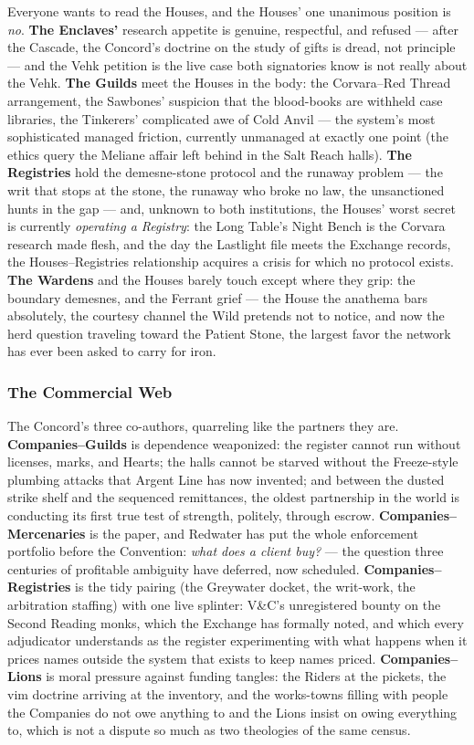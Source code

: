 Everyone wants to read the Houses, and the Houses' one unanimous position is \textit{no}. \textbf{The Enclaves'} research appetite is genuine, respectful, and refused --- after the Cascade, the Concord's doctrine on the study of gifts is dread, not principle --- and the Vehk petition is the live case both signatories know is not really about the Vehk. \textbf{The Guilds} meet the Houses in the body: the Corvara--Red Thread arrangement, the Sawbones' suspicion that the blood-books are withheld case libraries, the Tinkerers' complicated awe of Cold Anvil --- the system's most sophisticated managed friction, currently unmanaged at exactly one point (the ethics query the Meliane affair left behind in the Salt Reach halls). \textbf{The Registries} hold the demesne-stone protocol and the runaway problem --- the writ that stops at the stone, the runaway who broke no law, the unsanctioned hunts in the gap --- and, unknown to both institutions, the Houses' worst secret is currently \textit{operating a Registry}: the Long Table's Night Bench is the Corvara research made flesh, and the day the Lastlight file meets the Exchange records, the Houses--Registries relationship acquires a crisis for which no protocol exists. \textbf{The Wardens} and the Houses barely touch except where they grip: the boundary demesnes, and the Ferrant grief --- the House the anathema bars absolutely, the courtesy channel the Wild pretends not to notice, and now the herd question traveling toward the Patient Stone, the largest favor the network has ever been asked to carry for iron.

\subsubsection{The Commercial Web}

The Concord's three co-authors, quarreling like the partners they are. \textbf{Companies--Guilds} is dependence weaponized: the register cannot run without licenses, marks, and Hearts; the halls cannot be starved without the Freeze-style plumbing attacks that Argent Line has now invented; and between the dusted strike shelf and the sequenced remittances, the oldest partnership in the world is conducting its first true test of strength, politely, through escrow. \textbf{Companies--Mercenaries} is the paper, and Redwater has put the whole enforcement portfolio before the Convention: \textit{what does a client buy?} --- the question three centuries of profitable ambiguity have deferred, now scheduled. \textbf{Companies--Registries} is the tidy pairing (the Greywater docket, the writ-work, the arbitration staffing) with one live splinter: V\&C's unregistered bounty on the Second Reading monks, which the Exchange has formally noted, and which every adjudicator understands as the register experimenting with what happens when it prices names outside the system that exists to keep names priced. \textbf{Companies--Lions} is moral pressure against funding tangles: the Riders at the pickets, the vim doctrine arriving at the inventory, and the works-towns filling with people the Companies do not owe anything to and the Lions insist on owing everything to, which is not a dispute so much as two theologies of the same census.

